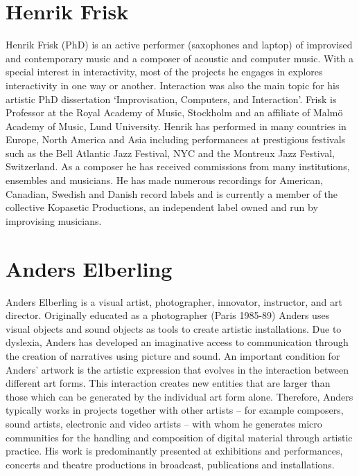 \documentclass[11pt]{article}
\begin{document}
\section*{Henrik Frisk}
\label{sec:org97172df}
Henrik Frisk (PhD) is an active performer (saxophones and laptop) of improvised and contemporary music and a composer of acoustic and computer music. With a special interest in interactivity, most of the projects he engages in explores interactivity in one way or another. Interaction was also the main topic for his artistic PhD dissertation `Improvisation, Computers, and Interaction'. Frisk is Professor at the Royal Academy of Music, Stockholm and an affiliate of Malmö Academy of Music, Lund University. Henrik has performed in many countries in Europe, North America and Asia including performances at prestigious festivals such as the Bell Atlantic Jazz Festival, NYC and the Montreux Jazz Festival, Switzerland. As a composer he has received commissions from many institutions, ensembles and musicians. He has made numerous recordings for American, Canadian, Swedish and Danish record labels and is currently a member of the collective Kopasetic Productions, an independent label owned and run by improvising musicians.

\section*{Anders Elberling}
\label{sec:org8956e2d}
Anders Elberling is a visual artist, photographer, innovator, instructor, and art director. Originally educated as a photographer (Paris 1985-89) Anders uses visual objects and sound objects as tools to create artistic installations. Due to dyslexia, Anders has developed an imaginative access to communication through the creation of narratives using picture and sound. An important condition for Anders’ artwork is the artistic expression that evolves in the interaction between different art forms. This interaction creates new entities that are larger than those which can be generated by the individual art form alone. Therefore, Anders typically works in projects together with other artists – for example composers, sound artists, electronic and video artists – with whom he generates micro communities for the handling and composition of digital material through artistic practice. His work is predominantly presented at exhibitions and performances, concerts and theatre productions in broadcast, publications and installations. 
\end{document}
